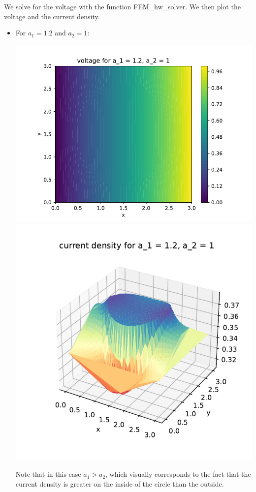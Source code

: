 \documentclass{article}
\begin{document}
We solve for the voltage with the function FEM\_hw\_solver. We then plot the voltage and the current density.
\begin{itemize}
	\item For $a_1=1.2$ and $a_2=1$:
	\begin{center}
		\includegraphics[scale=.4]{hw8 voltage 1}
		\includegraphics[scale=.4]{hw8 current 1}
	\end{center}
	Note that in this case $a_1>a_2$, which visually corresponds to the fact that the current density is greater on the inside of the circle than the outside.

\end{itemize}
\end{document}
